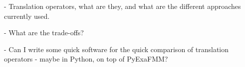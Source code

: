- Translation operators, what are they, and what are the different approaches currently used.

- What are the trade-offs? 

- Can I write some quick software for the quick comparison of translation operators - maybe in Python, on top of PyExaFMM?

